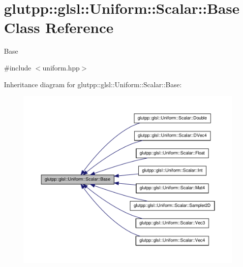 \hypertarget{classglutpp_1_1glsl_1_1Uniform_1_1Scalar_1_1Base}{\section{glutpp\-:\-:glsl\-:\-:\-Uniform\-:\-:\-Scalar\-:\-:\-Base \-Class \-Reference}
\label{classglutpp_1_1glsl_1_1Uniform_1_1Scalar_1_1Base}
}


\-Base  




{\ttfamily \#include $<$uniform.\-hpp$>$}



\-Inheritance diagram for glutpp\-:\-:glsl\-:\-:\-Uniform\-:\-:\-Scalar\-:\-:\-Base\-:
\nopagebreak
\begin{figure}[H]
\begin{center}
\leavevmode
\includegraphics[width=350pt]{classglutpp_1_1glsl_1_1Uniform_1_1Scalar_1_1Base__inherit__graph}
\end{center}
\end{figure}
